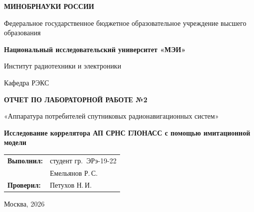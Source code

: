 \begin{titlepage}
    \centering
    {\bfseries МИНОБРНАУКИ РОССИИ\par}
    Федеральное государственное бюджетное образовательное учреждение высшего образования \\
    {\bfseries Национальный исследовательский университет «МЭИ»\par}
    \vspace{1cm}
    Институт радиотехники и электроники\par
    Кафедра РЭКС\par
    \vspace{3cm}
    
    {\bfseries\large ОТЧЕТ ПО ЛАБОРАТОРНОЙ РАБОТЕ №2\par}
    \vspace{0.5cm}
    {\large «Аппаратура потребителей спутниковых радионавигационных систем»\par}
    {\bfseries Исследование коррелятора АП СРНС ГЛОНАСС с помощью имитационной модели\par}
    
    \vspace{3.5cm}
 \vspace{1.5cm}
\noindent\hfill
\begin{tabular}{@{}ll@{}}
    \textbf{Выполнил:} & студент гр.~ЭРэ-19-22 \\
                        & Емельянов Р.\,С. \\[0.4cm]
    \textbf{Проверил:}  & Петухов Н.\,И.\\[0.4cm]
\end{tabular}   
    \vfill
    {Москва, 2026}
\end{titlepage}

